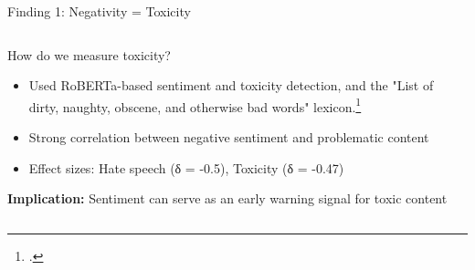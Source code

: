 \documentclass[10pt]{beamer}
\begin{document}
\begin{frame}{Finding 1: Negativity = Toxicity}

\begin{columns}
\begin{column}{0.67\textwidth}

How do we measure toxicity?

\begin{itemize}
\item Used RoBERTa-based sentiment and toxicity detection, and the "List of dirty, naughty, obscene, and otherwise bad words" lexicon.\footcite{camacho-collados_tweetnlp_2022, nicholas22aira, LDNOOBW2025}
\item Strong correlation between negative sentiment and problematic content

\item Effect sizes: Hate speech (δ = -0.5), Toxicity (δ = -0.47)
\end{itemize}

\textbf{Implication:} Sentiment can serve as an early warning signal for toxic content
\end{column}

\begin{column}{0.33\textwidth}


\end{column}
\end{columns}
\end{frame}
\end{document}
